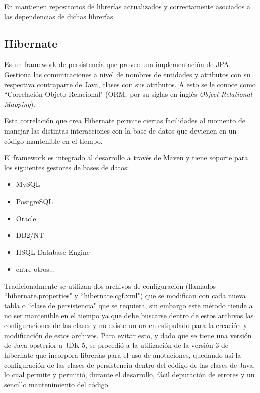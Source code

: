         En \cite{APACHE-maven} mantienen repositorios de librerías actualizados y correctamente asociados a las dependencias de dichas librerías.
        
        \subsection{Hibernate}
        \label{tecno-hibernate}
        
        Es un framework de persistencia que provee una implementación de JPA\cite{HIBERNATE-basico}. Gestiona las comunicaciones a nivel de nombres de entidades y atributos con su respectiva contraparte de Java, clases con sus atributos. A esto se le conoce como ``Correlación Objeto-Relacional" (ORM, por su siglas en inglés \textit{Object Relational Mapping}).
        
        Esta correlación que crea Hibernate permite ciertas facilidades al momento de manejar las distintas interacciones con la base de datos que devienen en un código mantenible en el tiempo.
        
        El framework es integrado al desarrollo a través de Maven y tiene soporte para los siguientes gestores de bases de datos\cite{HIBERNATE-tutorial}: 
        \begin{itemize}
            \item MySQL
            \item PostgreSQL
            \item Oracle
            \item DB2/NT
            \item HSQL Database Engine
            \item entre otros...
        \end{itemize}
        
        Tradicionalmente se utilizan dos archivos de configuración (llamados ``hibernate.properties" y ``hibernate.cgf.xml") que se modifican con cada nueva tabla o ``clase de persistencia" que se requiera, sin embargo este método tiende a no ser mantenible en el tiempo ya que debe buscarse dentro de estos archivos las configuraciones de las clases y no existe un orden estipulado para la creación y modificación de estos archivos. Para evitar esto, y dado que se tiene una versión de Java opsterior a JDK 5, se procedió a la utilización de la versión 3 de hibernate que incorpora librerías para el uso de anotaciones, quedando así la configuración de las clases de persistencia dentro del código de las clases de Java, lo cual permite y permitió, durante el desarrollo, fácil depuración de errores y un sencillo mantenimiento del código.
        
